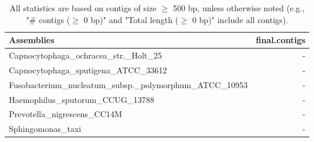 \documentclass[12pt,a4paper]{article}
\begin{document}
\begin{table}[ht]
\begin{center}
\caption{All statistics are based on contigs of size $\geq$ 500 bp, unless otherwise noted (e.g., "\# contigs ($\geq$ 0 bp)" and "Total length ($\geq$ 0 bp)" include all contigs).}
\begin{tabular}{|l*{1}{|r}|}
\hline
Assemblies & final.contigs \\ \hline
Capnocytophaga\_ochracea\_str.\_Holt\_25 & - \\ \hline
Capnocytophaga\_sputigena\_ATCC\_33612 & - \\ \hline
Fusobacterium\_nucleatum\_subsp.\_polymorphum\_ATCC\_10953 & - \\ \hline
Haemophilus\_sputorum\_CCUG\_13788 & - \\ \hline
Prevotella\_nigrescens\_CC14M & - \\ \hline
Sphingomonas\_taxi & - \\ \hline
\end{tabular}
\end{center}
\end{table}
\end{document}
